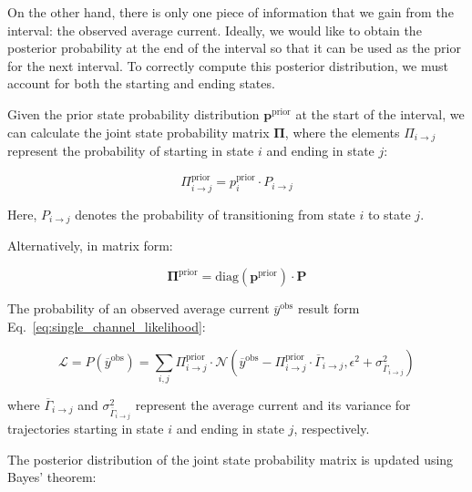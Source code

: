 \documentclass[pdflatex,sn-mathphys-num]{sn-jnl}%
\theoremstyle{thmstyleone}%
\theoremstyle{thmstyletwo}%
\theoremstyle{thmstylethree}%
\begin{document}
On the other hand, there is only one piece of information that we gain from the interval: the observed average current. Ideally, we would like to obtain the posterior probability at the end of the interval so that it can be used as the prior for the next interval. To correctly compute this posterior distribution, we must account for both the starting and ending states.

Given the prior state probability distribution \( \boldsymbol{p}^{\text{prior}} \) at the start of the interval, we can calculate the joint state probability matrix \( \boldsymbol{\Pi} \), where the elements \( \Pi_{i \rightarrow j} \) represent the probability of starting in state \( i \) and ending in state \( j \):

\begin{equation}
	\Pi_{i \rightarrow j}^{\text{prior}} = p^{\text{prior}}_i \cdot P_{i \rightarrow j}
	\label{eq:joint_state_probability}
\end{equation}

Here, \( P_{i \rightarrow j} \) denotes the probability of transitioning from state \( i \) to state \( j \).

Alternatively, in matrix form:

\begin{equation}
	\boldsymbol{\Pi}^{\text{prior}} = \mathrm{diag}(\boldsymbol{p}^{\text{prior}}) \cdot \mathbf{P}
	\label{eq:joint_state_probability_matrix}
\end{equation}

The probability of an observed average current \( \overline{y}^{\text{obs}} \) result form Eq.~\ref{eq:single_channel_likelihood}:

\begin{equation}
	\mathcal{L}=P(\overline{y}^{\text{obs}}) = \sum_{i, j} \Pi_{i \rightarrow j}^{\text{prior}} \cdot \mathcal{N}\left(\overline{y}^{\text{obs}} - \Pi_{i \rightarrow j}^{\text{prior}} \cdot \overline{\Gamma}_{i \rightarrow j}, \epsilon^2 + \sigma^2_{\overline{\Gamma}_{i \rightarrow j}}\right)
	\label{eq:single_channel_integrated_likelihood}
\end{equation}

where \( \overline{\Gamma}_{i \rightarrow j} \) and \( \sigma^2_{\overline{\Gamma}_{i \rightarrow j}} \) represent the average current and its variance for trajectories starting in state \( i \) and ending in state \( j \), respectively.

The posterior distribution of the joint state probability matrix is updated using Bayes' theorem:
\end{document}
